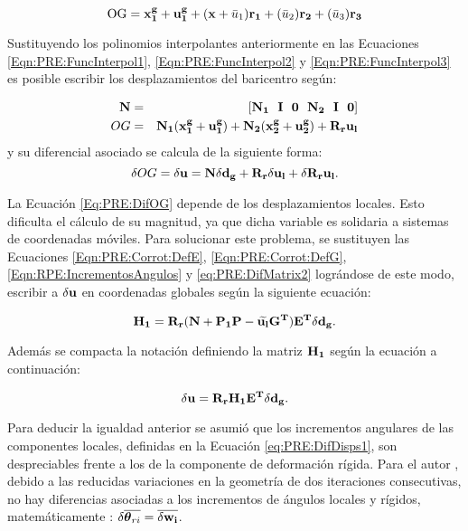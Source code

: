 \begin{equation}\label{Eqn:PRE:DispsOG}
 	\text{OG} = \bf{x}_1^g+\bf{u}_1^g + (x+\text{$\bar{u}_1$}) \bf{r_1} + (\text{$\bar{u}_2$})\bf{r_2}+ (\text{$\bar{u}_3$})\bf{r_3}
\end{equation}

Sustituyendo los polinomios interpolantes anteriormente en las Ecuaciones \eqref{Eqn:PRE:FuncInterpol1}, \eqref{Eqn:PRE:FuncInterpol2} y \eqref{Eqn:PRE:FuncInterpol3} es posible escribir los desplazamientos del baricentro según: 

\begin{eqnarray}
	\bf{N}&=&[\bf{N_1}~~ \bf{I}~~ \bf{0}~~ \bf{N_2}~~ \bf{I}~~ \bf{0}]\\
	OG    &=& \bf{N_1}(\bf{x}_1^g+\bf{u}_1^g)+\bf{N_2}(\bf{x}_2^g+\bf{u}_2^g)+ \bf{R}_r \bf{u}_l
\end{eqnarray}
y su diferencial asociado se calcula de la siguiente forma:
\begin{equation}
	\label{Eq:PRE:DifOG}
	\delta OG = \delta \bf{u} = \bf{N}\delta\bf{d}_g+\bf{R}_r \delta\bf{u}_l + \delta \bf{R}_r \bf{u}_l.
\end{equation}

 La Ecuación \eqref{Eq:PRE:DifOG} depende de los desplazamientos locales. Esto dificulta el cálculo de su magnitud, ya que dicha variable es solidaria a sistemas de coordenadas móviles. Para solucionar este problema, se sustituyen las Ecuaciones \eqref{Eqn:PRE:Corrot:DefE}, \eqref{Eqn:PRE:Corrot:DefG}, \eqref{Eqn:RPE:IncrementosAngulos} y \eqref{eq:PRE:DifMatrix2} lográndose de este modo, escribir a $ \delta \bf{u}$ en coordenadas globales según la siguiente ecuación:

 \begin{equation}
	 \bf{H}_1 = \bf{R}_r(\bf{N}+\bf{P}_1\bf{P}-\widetilde{\bf{u}_l}\bf{G}^T)\bf{E}^T \delta \bf{d}_g.
 \end{equation}

 Además se compacta la notación definiendo la matriz $\bf{H}_1$ según la ecuación a continuación:
 
 \begin{equation}
 	\label{Eqn:PRE:DifUDefH1}
	\delta \bf{u}= \bf{R}_r \bf{H}_1 \bf{E}^T \delta \bf{d}_g.
 \end{equation}

 Para deducir la igualdad anterior se asumió que los incrementos angulares de las componentes locales, definidas en la Ecuación \eqref{eq:PRE:DifDisps1}, son despreciables frente a los de la componente de deformación rígida. Para el autor \cite{Le2014}, debido a las reducidas variaciones en la geometría de dos iteraciones consecutivas, no hay diferencias asociadas a los incrementos de ángulos locales y rígidos, matemáticamente : $\delta \overline{\boldsymbol{\theta}_{ri}}= \overline{\delta \bf{w}_i}$.


